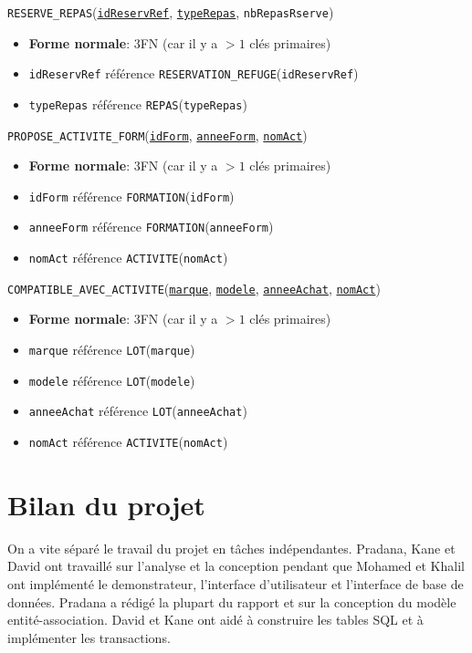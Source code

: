 \documentclass[12pt, a4paper]{article}
\newcommand\att[1]{\textnhtt{#1}}
\begin{document}
\att{RESERVE\_REPAS}(\att{\underline{idReservRef}}, \att{\underline{typeRepas}}, \att{nbRepasRserve})
\begin{itemize}
\item \textbf{Forme normale}: 3FN (car il y a $>1$ clés primaires)
\item \att{idReservRef} référence \att{RESERVATION\_REFUGE}(\att{idReservRef})
\item \att{typeRepas} référence \att{REPAS}(\att{typeRepas})
\end{itemize}

\att{PROPOSE\_ACTIVITE\_FORM}(\att{\underline{idForm}}, \att{\underline{anneeForm}}, \att{\underline{nomAct}})
\begin{itemize}
\item \textbf{Forme normale}: 3FN (car il y a $>1$ clés primaires)
\item \att{idForm} référence \att{FORMATION}(\att{idForm})
\item \att{anneeForm} référence \att{FORMATION}(\att{anneeForm})
\item \att{nomAct} référence \att{ACTIVITE}(\att{nomAct})
\end{itemize}

\att{COMPATIBLE\_AVEC\_ACTIVITE}(\att{\underline{marque}}, \att{\underline{modele}}, \att{\underline{anneeAchat}}, \att{\underline{nomAct}})
\begin{itemize}
\item \textbf{Forme normale}: 3FN (car il y a $>1$ clés primaires)
\item \att{marque} référence \att{LOT}(\att{marque})
\item \att{modele} référence \att{LOT}(\att{modele})
\item \att{anneeAchat} référence \att{LOT}(\att{anneeAchat})
\item \att{nomAct} référence \att{ACTIVITE}(\att{nomAct})
\end{itemize}


\section{Bilan du projet}
On a vite séparé le travail du projet en tâches indépendantes. Pradana, Kane et David ont travaillé sur l'analyse et la conception pendant que Mohamed et Khalil ont
implémenté le demonstrateur, l'interface d'utilisateur et l'interface de base de données. Pradana a rédigé la plupart du rapport et sur la conception du modèle entité-association.
David et Kane ont aidé à construire les tables SQL et à implémenter les transactions. 

\end{document}
